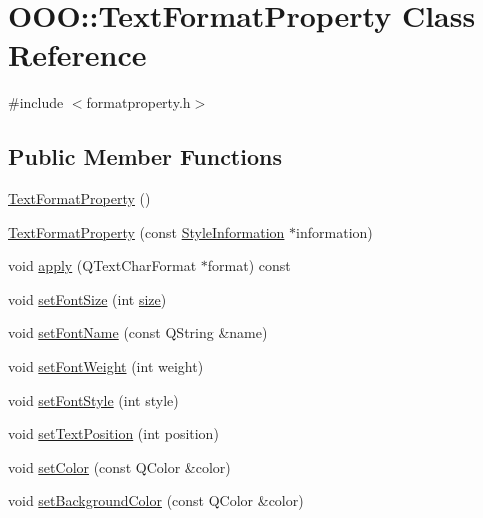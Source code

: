 \hypertarget{classOOO_1_1TextFormatProperty}{\section{O\+O\+O\+:\+:Text\+Format\+Property Class Reference}
\label{classOOO_1_1TextFormatProperty}
}


{\ttfamily \#include $<$formatproperty.\+h$>$}

\subsection*{Public Member Functions}
\begin{DoxyCompactItemize}
\item 
\hyperlink{classOOO_1_1TextFormatProperty_a03ef18fda91a25fd7ad515a161c380ea}{Text\+Format\+Property} ()
\item 
\hyperlink{classOOO_1_1TextFormatProperty_a7f96f718890d643404d36daf6dfa4e5e}{Text\+Format\+Property} (const \hyperlink{classOOO_1_1StyleInformation}{Style\+Information} $\ast$information)
\item 
void \hyperlink{classOOO_1_1TextFormatProperty_af3a7e53d62458bfccdf7854b2529221a}{apply} (Q\+Text\+Char\+Format $\ast$format) const 
\item 
void \hyperlink{classOOO_1_1TextFormatProperty_a5f420be6283e7042d768f7b3ed91b605}{set\+Font\+Size} (int \hyperlink{synctex__parser_8c_aa23c661441688350614bd6a350d2b6ff}{size})
\item 
void \hyperlink{classOOO_1_1TextFormatProperty_ae449bc9db37027f3f729f165a709a49e}{set\+Font\+Name} (const Q\+String \&name)
\item 
void \hyperlink{classOOO_1_1TextFormatProperty_a87c3db1e1660a7cc872ccf9127cbb03a}{set\+Font\+Weight} (int weight)
\item 
void \hyperlink{classOOO_1_1TextFormatProperty_a35c7e0c3c2da4bc599149459ad2bee54}{set\+Font\+Style} (int style)
\item 
void \hyperlink{classOOO_1_1TextFormatProperty_af10f32186e0b4ffecc3c488eb821beeb}{set\+Text\+Position} (int position)
\item 
void \hyperlink{classOOO_1_1TextFormatProperty_a1e001a086aa1ad7a0769ff76d0fa7305}{set\+Color} (const Q\+Color \&color)
\item 
void \hyperlink{classOOO_1_1TextFormatProperty_a7c4291db58c69ee44f59638d6754dd58}{set\+Background\+Color} (const Q\+Color \&color)
\end{DoxyCompactItemize}


